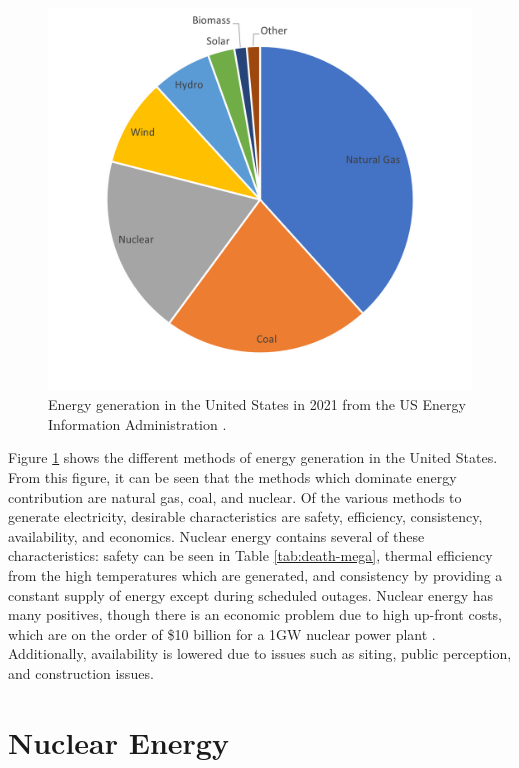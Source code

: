 \begin{figure}[H]
  \centering
  \includegraphics[scale=0.7]{images/US-energy-prod.png}
	\caption{Energy generation in the United States in 2021 from the US Energy Information Administration \cite{tyra_electric_2022}.}
   \label{fig:energy-gen-methods}
\end{figure}

Figure \ref{fig:energy-gen-methods} shows the different methods of energy generation in the United States. From this figure, it can be seen that the methods which dominate energy contribution are natural gas, coal, and nuclear.
Of the various methods to generate electricity, desirable characteristics are safety, efficiency, consistency, availability, and economics.
Nuclear energy contains several of these characteristics: safety can be seen in Table \ref{tab:death-mega}, thermal efficiency from the high temperatures which are generated, and consistency by providing a constant supply of energy except during scheduled outages.
Nuclear energy has many positives, though there is an economic problem due to high up-front costs, which are on the order of \$10 billion for a 1GW nuclear power plant \cite{du_update_2009}. Additionally, availability is lowered due to issues such as siting, public perception, and construction issues. 

\section{Nuclear Energy}

